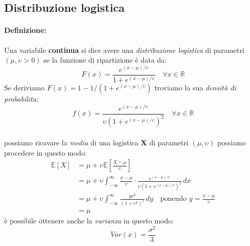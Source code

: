 \documentclass[]{article}
\newcommand{\ev}{\mathbb{E}[X]}
\renewcommand{\ev}[1]{\mathbb{E}[#1]}
\newcommand{\definizione}{\paragraph{Definizione:}}
\begin{document}
    \subsection{Distribuzione logistica}
    \definizione Una variabile \textbf{continua} si dice avere una \textit{distribuzione logistica} di parametri $(\mu, \upsilon > 0 )$ se la funzione di ripartizione è data da:
    \[ F(x) = \frac{e^{(x-\mu)/\upsilon}}{1 + e^{(x-\mu)/\upsilon}} \quad \forall x \in \mathbb{R} \]
    Se deriviamo $F(x) = 1 - 1/(1+e^{(x-\mu)/\upsilon})$ troviamo la sua \textit{densità di probabilita:}
    \[ f(x) = \frac{e^{(x-\mu)/\upsilon}}{\upsilon(1 + e^{(x-\mu)/\upsilon})^2} \quad \forall x \in \mathbb{R} \] \\
    possiamo ricavare la \textit{media} di una logistica \textbf{X} di parametri $(\mu, \upsilon)$ possiamo procedere in questo modo:
    \begin{equation*}
        \begin{split}
            \ev{X} &= \mu + \upsilon \ev{\frac{X - \mu}{\upsilon}} \\
            &= \mu + \upsilon \int_{-\infty}^{\infty} \frac{x- \mu}{\upsilon} \cdot \frac{e^{(x-\mu)/\upsilon}}{\upsilon(1+e^{(x - \mu)/\upsilon})^2} \, dx \\
            &= \mu + \upsilon \int_{-\infty}^{\infty} \frac{ye^y}{(1+e^y)^2} \, dy \quad \text{ponendo } y=\frac{x - \mu}{\upsilon} \\
            &= \mu
        \end{split}
    \end{equation*}
    è possibile ottenere anche la \textit{varianza} in questo modo:
    \[ Var(x) = \frac{\sigma^2}{3}\]
\end{document}
